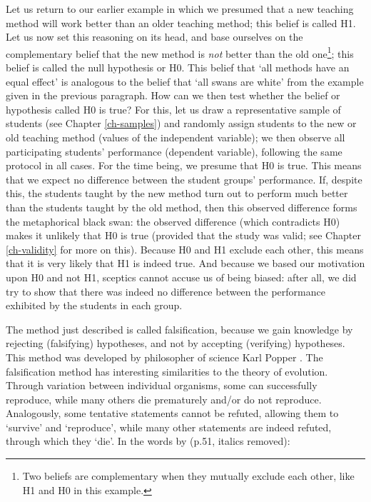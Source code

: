 \documentclass[
]{book}
\begin{document}
Let us return to our earlier example in which we presumed that a new teaching method will work better than an older teaching method; this belief is called H1. Let us now set this reasoning on its head, and base ourselves on the complementary belief that the new method is \emph{not} better than the old one\footnote{Two beliefs are complementary when they mutually exclude each other, like H1 and H0 in this example.}; this belief is called the null hypothesis or H0. This belief that `all methods have an equal effect' is analogous to the belief that `all swans are white' from the example given in the previous paragraph. How can we then test whether the belief or hypothesis called H0 is true? For this, let us draw a representative sample of students (see Chapter \ref{ch-samples}) and randomly assign students to the new or old teaching method (values of the independent variable); we then observe all participating students' performance (dependent variable), following the same protocol in all cases. For the time being, we presume that H0 is true. This means that we expect no difference between the student groups' performance. If, despite this, the students taught by the new method turn out to perform much better than the students taught by the old method, then this observed difference forms the metaphorical black swan: the observed difference (which contradicts H0) makes it unlikely that H0 is true (provided that the study was valid; see Chapter \ref{ch-validity} for more on this). Because H0 and H1 exclude each other, this means that it is very likely that H1 is indeed true. And because we based our motivation upon H0 and not H1, sceptics cannot accuse us of being biased: after all, we did try to show that there was indeed no difference between the performance exhibited by the students in each group.

The method just described is called falsification, because we gain knowledge by rejecting (falsifying) hypotheses, and not by accepting (verifying) hypotheses. This method was developed by philosopher of science Karl Popper \citep{Popp35, Popp59, Popp63}. The falsification method has interesting similarities to the theory of evolution. Through variation between individual organisms, some can successfully reproduce, while many others die prematurely and/or do not reproduce. Analogously, some tentative statements cannot be refuted, allowing them to `survive' and `reproduce', while many other statements are indeed refuted, through which they `die'. In the words by \citet{Popp63} (p.51, italics removed):
\end{document}
